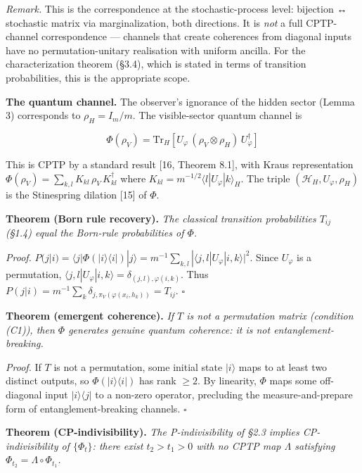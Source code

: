 \documentclass[
]{article}
\begin{document}
\emph{Remark.} This is the correspondence at the stochastic-process
level: bijection ↔ stochastic matrix via marginalization, both
directions. It is \emph{not} a full CPTP-channel correspondence ---
channels that create coherences from diagonal inputs have no
permutation-unitary realisation with uniform ancilla. For the
characterization theorem (§3.4), which is stated in terms of transition
probabilities, this is the appropriate scope.

\textbf{The quantum channel.} The observer's ignorance of the hidden
sector (Lemma 3) corresponds to \(\rho_H = I_m/m\). The visible-sector
quantum channel is

\[\Phi(\rho_V) = \mathrm{Tr}_H\!\left[U_\varphi\,(\rho_V \otimes \rho_H)\,U_\varphi^\dagger\right]\]

This is CPTP by a standard result {[}16, Theorem 8.1{]}, with Kraus
representation
\(\Phi(\rho_V) = \sum_{k,l} K_{kl}\,\rho_V\,K_{kl}^\dagger\) where
\(K_{kl} = m^{-1/2}\langle l|U_\varphi|k\rangle_H\). The triple
\((\mathcal{H}_H, U_\varphi, \rho_H)\) is the Stinespring dilation
{[}15{]} of \(\Phi\).

\textbf{Theorem (Born rule recovery).} \emph{The classical transition
probabilities \(T_{ij}\) (§1.4) equal the Born-rule probabilities of
\(\Phi\).}

\emph{Proof.}
\(P(j|i) = \langle j|\Phi(|i\rangle\langle i|)|j\rangle = m^{-1}\sum_{k,l} |\langle j,l|U_\varphi|i,k\rangle|^2\).
Since \(U_\varphi\) is a permutation,
\(\langle j,l|U_\varphi|i,k\rangle = \delta_{(j,l),\varphi(i,k)}\). Thus
\(P(j|i) = m^{-1}\sum_k \delta_{j,\pi_V(\varphi(x_i,h_k))} = T_{ij}\).
\(\square\)

\textbf{Theorem (emergent coherence).} \emph{If \(T\) is not a
permutation matrix (condition (C1)), then \(\Phi\) generates genuine
quantum coherence: it is not entanglement-breaking.}

\emph{Proof.} If \(T\) is not a permutation, some initial state
\(|i\rangle\) maps to at least two distinct outputs, so
\(\Phi(|i\rangle\langle i|)\) has rank \(\geq 2\). By linearity,
\(\Phi\) maps some off-diagonal input \(|i\rangle\langle j|\) to a
non-zero operator, precluding the measure-and-prepare form of
entanglement-breaking channels. \(\square\)

\textbf{Theorem (CP-indivisibility).} \emph{The P-indivisibility of §2.3
implies CP-indivisibility of \(\{\Phi_t\}\): there exist
\(t_2 > t_1 > 0\) with no CPTP map \(\Lambda\) satisfying
\(\Phi_{t_2} = \Lambda \circ \Phi_{t_1}\).}
\end{document}
